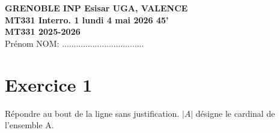 \documentclass[11pt,a4paper]{article}
\begin{document}
\begin{center}
    \textbf{GRENOBLE INP Esisar UGA, VALENCE} \\
    \textbf{MT331 Interro. 1 lundi 4 mai 2026 45'} \\
    \textbf{MT331 2025-2026} \\
    Prénom NOM: ...................................
\end{center}

\vspace{0.5cm}

\section*{Exercice 1}
Répondre au bout de la ligne sans justification. $|A|$ désigne le cardinal de l'ensemble A.
\end{document}
